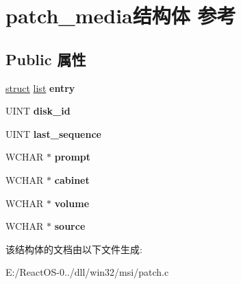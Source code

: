 \hypertarget{structpatch__media}{}\section{patch\+\_\+media结构体 参考}
\label{structpatch__media}
\subsection*{Public 属性}
\begin{DoxyCompactItemize}
\item 
\mbox{\label{structpatch__media_a867669f596d2a499619c716e1913447f}} 
\hyperlink{interfacestruct}{struct} \hyperlink{classlist}{list} {\bfseries entry}
\item 
\mbox{\label{structpatch__media_a9b41631be91b57cfede04420fd0a9a40}} 
U\+I\+NT {\bfseries disk\+\_\+id}
\item 
\mbox{\label{structpatch__media_a703d4253a025bdbaafb60af3d0b6db03}} 
U\+I\+NT {\bfseries last\+\_\+sequence}
\item 
\mbox{\label{structpatch__media_a98dec77faa9829b5db069d1486426fb3}} 
W\+C\+H\+AR $\ast$ {\bfseries prompt}
\item 
\mbox{\label{structpatch__media_a7aa93926f9186a02f9a5284dc416d14d}} 
W\+C\+H\+AR $\ast$ {\bfseries cabinet}
\item 
\mbox{\label{structpatch__media_adb940e9ffbce8c3db9be645219bb7ba6}} 
W\+C\+H\+AR $\ast$ {\bfseries volume}
\item 
\mbox{\label{structpatch__media_af2226790163004fa9ec2f93a8c53dad5}} 
W\+C\+H\+AR $\ast$ {\bfseries source}
\end{DoxyCompactItemize}


该结构体的文档由以下文件生成\+:\begin{DoxyCompactItemize}
\item 
E\+:/\+React\+O\+S-\/0../dll/win32/msi/patch.\+c\end{DoxyCompactItemize}

